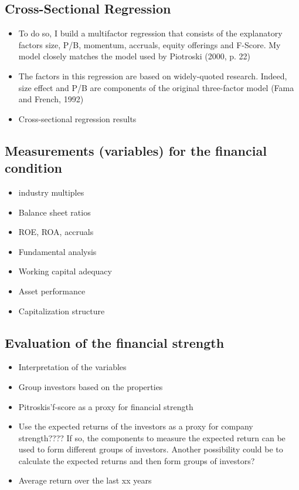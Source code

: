 \documentclass[12pt]{article}
\begin{document}
\subsection{Cross-Sectional Regression}

    \begin{itemize}
        \item To do so, I build a multifactor regression that consists of the explanatory factors size, P/B, momentum, accruals, equity offerings and F-Score. My model closely matches the model used by Piotroski (2000, p. 22) \citep{Mohr2012}

        \item The factors in this regression are based on widely-quoted research. Indeed, size effect and P/B are components of the original three-factor model (Fama and French, 1992) \citep{Mohr2012}

        \item Cross-sectional regression results \citep[p.3094]{Akhigbe2007}
    \end{itemize}


\subsection{Measurements (variables) for the financial condition} 
    
    \begin{itemize}

        \item industry multiples
        \item Balance sheet ratios
        \item ROE, ROA, accruals 
        \item Fundamental analysis
        \item Working capital adequacy
        \item Asset performance
        \item Capitalization structure

    \end{itemize}
    
\subsection{Evaluation of the financial strength} 
    
    \begin{itemize}

        \item Interpretation of the variables
        \item Group investors based on the properties
        \item Pitroskis'f-score as a proxy for financial strength
        \item Use the expected returns of the investors as a proxy for company strength???? If so, the components to measure the expected return can be used to form different groups of investors. Another possibility could be to calculate the expected returns and then form groups of investors? 
        \item Average return over the last xx years 

    \end{itemize}
\end{document}
